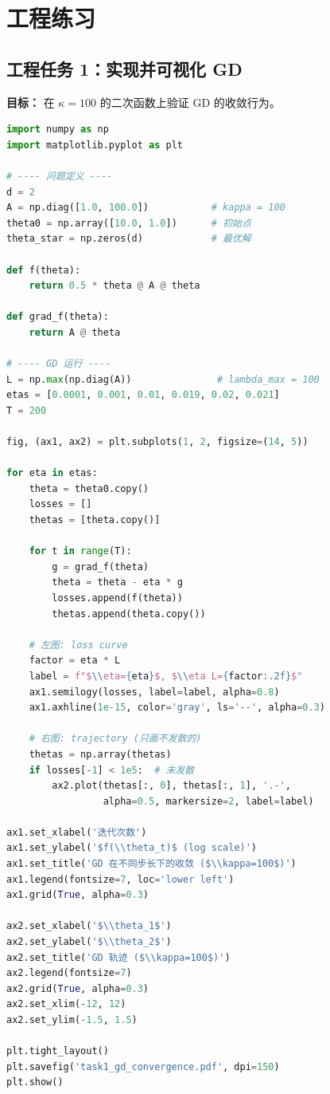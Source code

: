 \documentclass[12pt,a4paper]{ctexart}
\theoremstyle{definition}
\theoremstyle{plain}
\begin{document}
\section{工程练习}

\subsection{工程任务 1：实现并可视化 GD}

\noindent\textbf{目标：} 在 $\kappa=100$ 的二次函数上验证 GD 的收敛行为。

\begin{lstlisting}[language=Python, caption={GD 在不同步长下的收敛行为}]
import numpy as np
import matplotlib.pyplot as plt

# ---- 问题定义 ----
d = 2
A = np.diag([1.0, 100.0])           # kappa = 100
theta0 = np.array([10.0, 1.0])      # 初始点
theta_star = np.zeros(d)            # 最优解

def f(theta):
    return 0.5 * theta @ A @ theta

def grad_f(theta):
    return A @ theta

# ---- GD 运行 ----
L = np.max(np.diag(A))               # lambda_max = 100
etas = [0.0001, 0.001, 0.01, 0.019, 0.02, 0.021]
T = 200

fig, (ax1, ax2) = plt.subplots(1, 2, figsize=(14, 5))

for eta in etas:
    theta = theta0.copy()
    losses = []
    thetas = [theta.copy()]

    for t in range(T):
        g = grad_f(theta)
        theta = theta - eta * g
        losses.append(f(theta))
        thetas.append(theta.copy())

    # 左图: loss curve
    factor = eta * L
    label = f"$\\eta={eta}$, $\\eta L={factor:.2f}$"
    ax1.semilogy(losses, label=label, alpha=0.8)
    ax1.axhline(1e-15, color='gray', ls='--', alpha=0.3)

    # 右图: trajectory (只画不发散的)
    thetas = np.array(thetas)
    if losses[-1] < 1e5:  # 未发散
        ax2.plot(thetas[:, 0], thetas[:, 1], '.-',
                 alpha=0.5, markersize=2, label=label)

ax1.set_xlabel('迭代次数')
ax1.set_ylabel('$f(\\theta_t)$ (log scale)')
ax1.set_title('GD 在不同步长下的收敛 ($\\kappa=100$)')
ax1.legend(fontsize=7, loc='lower left')
ax1.grid(True, alpha=0.3)

ax2.set_xlabel('$\\theta_1$')
ax2.set_ylabel('$\\theta_2$')
ax2.set_title('GD 轨迹 ($\\kappa=100$)')
ax2.legend(fontsize=7)
ax2.grid(True, alpha=0.3)
ax2.set_xlim(-12, 12)
ax2.set_ylim(-1.5, 1.5)

plt.tight_layout()
plt.savefig('task1_gd_convergence.pdf', dpi=150)
plt.show()
\end{lstlisting}
\end{document}
